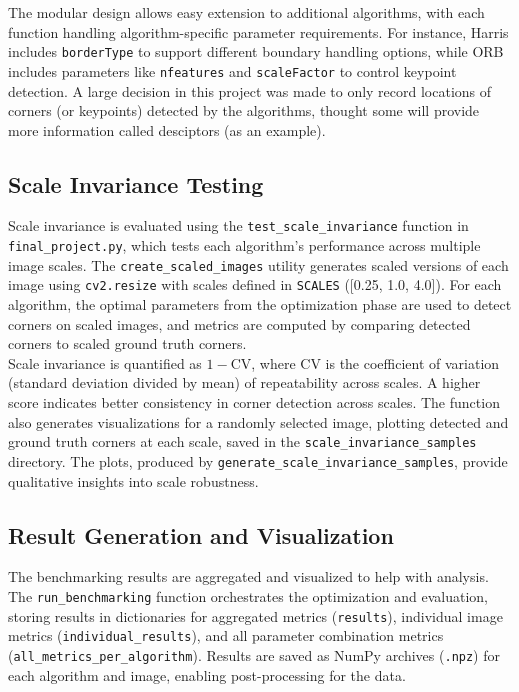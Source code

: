 \documentclass[journal]{IEEEtran}
\begin{document}
The modular design allows easy extension to additional algorithms, with each function handling algorithm-specific parameter requirements. For instance, Harris includes \texttt{borderType} to support different boundary handling options, while ORB includes parameters like \texttt{nfeatures} and \texttt{scaleFactor} to control keypoint detection. A large decision in this project was made to only record locations of corners (or keypoints) detected by the algorithms, thought some will provide more information called desciptors (as an example). \\

\subsection{Scale Invariance Testing}
Scale invariance is evaluated using the \texttt{test\_scale\_invariance} function in \texttt{final\_project.py}, which tests each algorithm’s performance across multiple image scales. The \texttt{create\_scaled\_images} utility generates scaled versions of each image using \texttt{cv2.resize} with scales defined in \texttt{SCALES} ([0.25, 1.0, 4.0]). For each algorithm, the optimal parameters from the optimization phase are used to detect corners on scaled images, and metrics are computed by comparing detected corners to scaled ground truth corners.\\

Scale invariance is quantified as \( 1 - \text{CV} \), where CV is the coefficient of variation (standard deviation divided by mean) of repeatability across scales. A higher score indicates better consistency in corner detection across scales. The function also generates visualizations for a randomly selected image, plotting detected and ground truth corners at each scale, saved in the \texttt{scale\_invariance\_samples} directory. The plots, produced by \texttt{generate\_scale\_invariance\_samples}, provide qualitative insights into scale robustness.\\

\subsection{Result Generation and Visualization}
The benchmarking results are aggregated and visualized to help with analysis. The \texttt{run\_benchmarking} function orchestrates the optimization and evaluation, storing results in dictionaries for aggregated metrics (\texttt{results}), individual image metrics (\texttt{individual\_results}), and all parameter combination metrics (\texttt{all\_metrics\_per\_algorithm}). Results are saved as NumPy archives (\texttt{.npz}) for each algorithm and image, enabling post-processing for the data.\\
\end{document}
